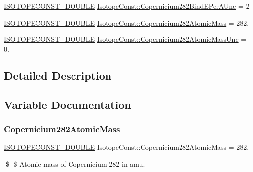 \begin{DoxyCompactItemize}
\item 
\mbox{\hyperlink{group___isotope_const-_macros_ga8f45a7272ce02c0b4c65c44636ed719a}{I\+S\+O\+T\+O\+P\+E\+C\+O\+N\+S\+T\+\_\+\+D\+O\+U\+B\+LE}} \mbox{\hyperlink{group___isotope_const-_copernicium-_cn282_ga3972db780670ec4d1b4bd56b8cf9f6d2}{Isotope\+Const\+::\+Copernicium282\+Bind\+E\+Per\+A\+Unc}} = 2
\item 
\mbox{\hyperlink{group___isotope_const-_macros_ga8f45a7272ce02c0b4c65c44636ed719a}{I\+S\+O\+T\+O\+P\+E\+C\+O\+N\+S\+T\+\_\+\+D\+O\+U\+B\+LE}} \mbox{\hyperlink{group___isotope_const-_copernicium-_cn282_ga5f6c86c39a7cc224d329c74ec08afaa6}{Isotope\+Const\+::\+Copernicium282\+Atomic\+Mass}} = 282.
\item 
\mbox{\hyperlink{group___isotope_const-_macros_ga8f45a7272ce02c0b4c65c44636ed719a}{I\+S\+O\+T\+O\+P\+E\+C\+O\+N\+S\+T\+\_\+\+D\+O\+U\+B\+LE}} \mbox{\hyperlink{group___isotope_const-_copernicium-_cn282_ga42fa7e8e758c94b27a7197aef7a7c85c}{Isotope\+Const\+::\+Copernicium282\+Atomic\+Mass\+Unc}} = 0.
\end{DoxyCompactItemize}


\subsection{Detailed Description}


\subsection{Variable Documentation}
\mbox{\label{group___isotope_const-_copernicium-_cn282_ga5f6c86c39a7cc224d329c74ec08afaa6}} 
\subsubsection{\texorpdfstring{Copernicium282\+Atomic\+Mass}{Copernicium282AtomicMass}}
{\footnotesize\ttfamily \mbox{\hyperlink{group___isotope_const-_macros_ga8f45a7272ce02c0b4c65c44636ed719a}{I\+S\+O\+T\+O\+P\+E\+C\+O\+N\+S\+T\+\_\+\+D\+O\+U\+B\+LE}} Isotope\+Const\+::\+Copernicium282\+Atomic\+Mass = 282.}

\$ \$ Atomic mass of Copernicium-\/282 in amu. \mbox{\label{group___isotope_const-_copernicium-_cn282_ga42fa7e8e758c94b27a7197aef7a7c85c}} 
